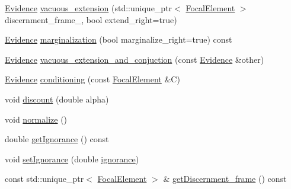 \begin{DoxyCompactItemize}
\item 
\hyperlink{classEvidence}{Evidence} \hyperlink{classEvidence_a17f68e6fd02cff470d046f89024dee64}{vacuous\+\_\+extension} (std\+::unique\+\_\+ptr$<$ \hyperlink{classFocalElement}{Focal\+Element} $>$ discernment\+\_\+frame\+\_, bool extend\+\_\+right=true)
\item 
\hyperlink{classEvidence}{Evidence} \hyperlink{classEvidence_a042d324e0ed4d3e07c87f16b4a1095ca}{marginalization} (bool marginalize\+\_\+right=true) const 
\item 
\hyperlink{classEvidence}{Evidence} \hyperlink{classEvidence_a10ac437fdfbdba9c819ef913cdca9178}{vacuous\+\_\+extension\+\_\+and\+\_\+conjuction} (const \hyperlink{classEvidence}{Evidence} \&other)
\item 
\hyperlink{classEvidence}{Evidence} \hyperlink{classEvidence_ad89a807b7f71a018f8dbf9224e74b52b}{conditioning} (const \hyperlink{classFocalElement}{Focal\+Element} \&C)
\item 
void \hyperlink{classEvidence_afaa46e0ce034a05c4749c7021430d60a}{discount} (double alpha)
\item 
void \hyperlink{classEvidence_aa6a44be2f65aa439e2bdcf9333659abb}{normalize} ()
\item 
double \hyperlink{classEvidence_a2d6b2109c1347c004d00c2ef6bd515d8}{get\+Ignorance} () const 
\item 
void \hyperlink{classEvidence_a11377c6946b7727015936b35dcf86cc8}{set\+Ignorance} (double \hyperlink{classEvidence_a77a5358b14a274c62a6b229ec4f844a0}{ignorance})
\item 
const std\+::unique\+\_\+ptr$<$ \hyperlink{classFocalElement}{Focal\+Element} $>$ \& \hyperlink{classEvidence_a875150a8830c15d0cf3391d73889214e}{get\+Discernment\+\_\+frame} () const 
\end{DoxyCompactItemize}
